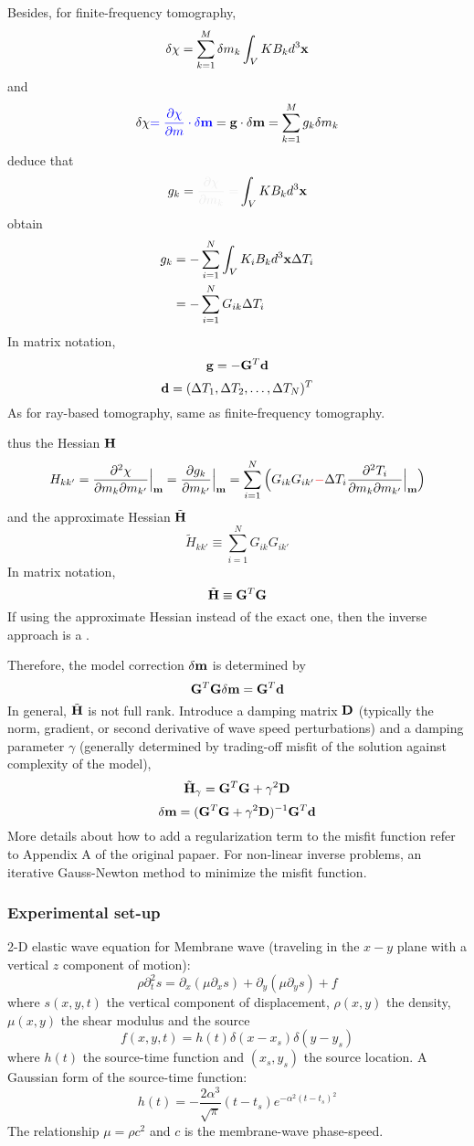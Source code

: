 Besides, for finite-frequency tomography,
\[ \delta\chi=\sum_{k=1}^M\delta m_k\int_VKB_kd^3\mathbf{x} \]
and
\[ \delta\chi{\color{blue}=\frac{\partial\chi}{\partial m}\cdot\delta\mathbf{m}}=\mathbf{g}\cdot\delta\mathbf{m}=\sum_{k=1}^Mg_k\delta m_k \]
deduce that
\[ g_k=\myde{\frac{\partial\chi}{\partial m_k}=}\int_VKB_kd^3\mbf x \]
obtain
\begin{align*}
  g_k & =-\sum_{i=1}^N\int_VK_iB_kd^3\mathbf{x}\Delta T_i \\
  & =-\sum_{i=1}^NG_{ik}\Delta T_i \\
\end{align*}
In matrix notation,
\[ \mathbf{g}=-\mathbf{G}^T\mathbf{d} \]
\[ \mathbf{d}=(\Delta T_1,\Delta T_2,\ldots,\Delta T_N)^T \]
As for ray-based tomography, same as finite-frequency tomography.\par
{}
thus the Hessian $\mathbf{H}$
\[ H_{kk'}=\frac{\partial^2\chi}{\partial m_k\partial m_{k'}}\Big|_{\mathbf{m}}=\frac{\partial g_k}{\partial m_{k'}}\Big|_{\mathbf{m}}=\sum_{i=1}^N\Big(G_{ik}G_{ik'}{\color{red}-}\Delta T_i\frac{\partial^2T_i}{\partial m_k\partial m_{k'}}\Big|_{\mathbf{m}}\Big) \]
and the approximate Hessian $\tilde{\mathbf{H}}$
\[ \tilde H_{kk'}\equiv\sum_{i=1}^NG_{ik}G_{ik'} \]
In matrix notation,
\[ \tilde{\mathbf{H}}\equiv\mathbf{G}^T\mathbf{G} \]
If using the approximate Hessian instead of the exact one, then the inverse approach is a .\par
Therefore, the model correction $\delta\mathbf{m}$ is determined by
\[ \mathbf{G}^T\mathbf{G}\delta\mathbf{m}=\mathbf{G}^T\mathbf{d} \]
In general, $\tilde{\mathbf{H}}$ is not full rank. Introduce a damping matrix $\mathbf{D}$ (typically the norm, gradient, or second derivative of wave speed perturbations) and a damping parameter $\gamma$ (generally determined by trading-off misfit of the solution against complexity of the model),
\[ \tilde{\mathbf{H}}_\gamma=\mathbf{G}^T\mathbf{G}+\gamma^2\mathbf{D} \]
\[ \delta\mathbf{m}=(\mathbf{G}^T\mathbf{G}+\gamma^2\mathbf{D})^{-1}\mathbf{G}^T\mathbf{d} \]
More details about how to add a regularization term to the misfit function refer to Appendix A of the original papaer. For non-linear inverse problems, an iterative Gauss-Newton method to minimize the misfit function.\par
\subsubsection{Experimental set-up}
2-D elastic wave equation for Membrane wave (traveling in the $x-y$ plane with a vertical $z$ component of motion):
\[ \rho\partial^2_ts=\partial_x(\mu\partial_xs)+\partial_y(\mu\partial_ys)+f \]
where $s(x,y,t)$ the vertical component of displacement, $\rho(x,y)$ the density, $\mu(x,y)$ the shear modulus and the source
\[ f(x,y,t)=h(t)\delta(x-x_s)\delta(y-y_s) \]
where $h(t)$ the source-time function and $(x_s,y_s)$ the source location. A Gaussian form of the source-time function:
\[ h(t)=-\frac{2\alpha^3}{\sqrt\pi}(t-t_s)e^{-\alpha^2(t-t_s)^2} \]
The relationship $\mu=\rho c^2$ and $c$ is the membrane-wave phase-speed.\par
